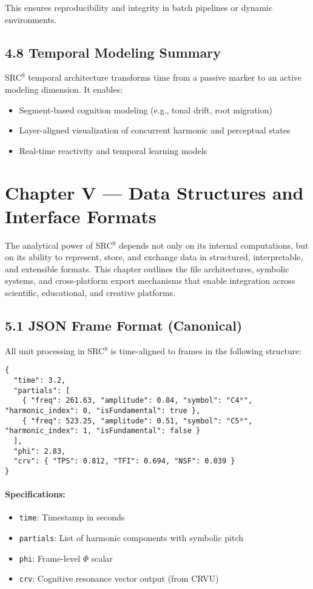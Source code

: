 This ensures reproducibility and integrity in batch pipelines or dynamic environments.

\subsection*{4.8 Temporal Modeling Summary}

SRC$^9$ temporal architecture transforms time from a passive marker to an active modeling dimension. It enables:

\begin{itemize}
    \item Segment-based cognition modeling (e.g., tonal drift, root migration)
    \item Layer-aligned visualization of concurrent harmonic and perceptual states
    \item Real-time reactivity and temporal learning models
\end{itemize}

\section*{Chapter V — Data Structures and Interface Formats}

The analytical power of SRC$^{9}$ depends not only on its internal computations, but on its ability to represent, store, and exchange data in structured, interpretable, and extensible formats. This chapter outlines the file architectures, symbolic systems, and cross-platform export mechanisms that enable integration across scientific, educational, and creative platforms.

\subsection*{5.1 JSON Frame Format (Canonical)}

All unit processing in SRC$^{9}$ is time-aligned to frames in the following structure:

\begin{verbatim}
{
  "time": 3.2,
  "partials": [
    { "freq": 261.63, "amplitude": 0.84, "symbol": "C4⁰", "harmonic_index": 0, "isFundamental": true },
    { "freq": 523.25, "amplitude": 0.51, "symbol": "C5⁰", "harmonic_index": 1, "isFundamental": false }
  ],
  "phi": 2.83,
  "crv": { "TPS": 0.812, "TFI": 0.694, "NSF": 0.039 }
}
\end{verbatim}

\paragraph{Specifications:}
\begin{itemize}
    \item \texttt{time}: Timestamp in seconds
    \item \texttt{partials}: List of harmonic components with symbolic pitch
    \item \texttt{phi}: Frame-level $\Phi$ scalar
    \item \texttt{crv}: Cognitive resonance vector output (from CRVU)
\end{itemize}

